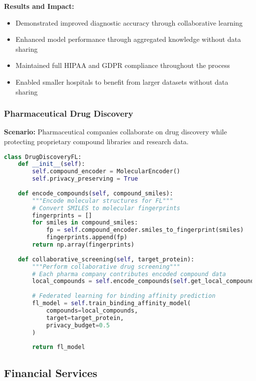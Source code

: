 \textbf{Results and Impact:}
\begin{itemize}
    \item Demonstrated improved diagnostic accuracy through collaborative learning
    \item Enhanced model performance through aggregated knowledge without data sharing
    \item Maintained full HIPAA and GDPR compliance throughout the process
    \item Enabled smaller hospitals to benefit from larger datasets without data sharing
\end{itemize}

\subsubsection{Pharmaceutical Drug Discovery}

\textbf{Scenario:} Pharmaceutical companies collaborate on drug discovery while protecting proprietary compound libraries and research data.

\begin{lstlisting}[language=python, caption=Drug Discovery FL Implementation]
class DrugDiscoveryFL:
    def __init__(self):
        self.compound_encoder = MolecularEncoder()
        self.privacy_preserving = True
        
    def encode_compounds(self, compound_smiles):
        """Encode molecular structures for FL"""
        # Convert SMILES to molecular fingerprints
        fingerprints = []
        for smiles in compound_smiles:
            fp = self.compound_encoder.smiles_to_fingerprint(smiles)
            fingerprints.append(fp)
        return np.array(fingerprints)
        
    def collaborative_screening(self, target_protein):
        """Perform collaborative drug screening"""
        # Each pharma company contributes encoded compound data
        local_compounds = self.encode_compounds(self.get_local_compounds())
        
        # Federated learning for binding affinity prediction
        fl_model = self.train_binding_affinity_model(
            compounds=local_compounds,
            target=target_protein,
            privacy_budget=0.5
        )
        
        return fl_model
\end{lstlisting}

\subsection{Financial Services}

